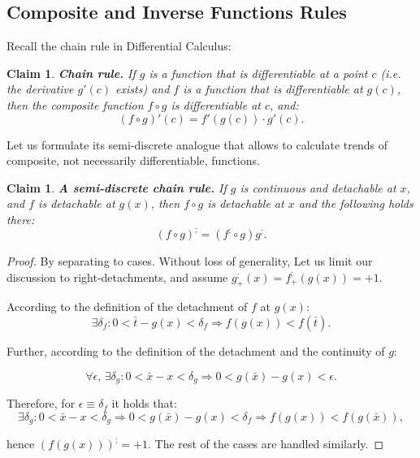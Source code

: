 \documentclass[11pt]{book}
\newtheorem{clm}[thm]{Claim}
\begin{document}
\subsection{Composite and Inverse Functions Rules}

Recall the chain rule in Differential Calculus:
\begin{clm}\textbf{Chain rule. }If $g$ is a function that is differentiable at a point $c$ (i.e. the derivative $g'\left(c\right)$ exists) and $f$ is a function that is differentiable at $g\left(c\right)$, then the composite function $f\circ g$ is differentiable at $c$, and:
$$\left(f\circ g\right)'\left(c\right)=f'\left(g\left(c\right)\right)\cdot g'\left(c\right).$$
\label{chain_rule_derivative}
\end{clm}
Let us formulate its semi-discrete analogue that allows to calculate trends of composite, not necessarily differentiable, functions.
\begin{clm}\textbf{A semi-discrete chain rule.} If $g$ is continuous and detachable at $x$, and $f$ is detachable at $g\left(x\right)$, then $f\circ g $ is detachable at $x$ and the following holds there:
$$\left( f \circ g \right) ^{;}=\left(f^{;}\circ g\right)g^{;}.$$
\label{chain_rule_detachment}
\end{clm}

\begin{proof}By separating to cases. Without loss of generality, Let us limit our discussion to right-detachments, and assume $g_{+}^{;}\left(x\right)=f_{+}^{;}\left(g\left(x\right)\right)=+1.$

According to the definition of the detachment of $f$ at $g\left(x\right)$:
$$\exists\delta_{f}:0<\bar{t}-g\left(x\right)<\delta_{f}\Longrightarrow f\left(g\left(x\right)\right)<f\left(\bar{t}\right).$$

Further, according to the definition of the detachment and the continuity of $g$:

$$\forall\epsilon,\,\exists\delta_{g}:0<\bar{x}-x<\delta_{g}\Longrightarrow0<g\left(\bar{x}\right)-g\left(x\right)<\epsilon.$$

Therefore, for $\epsilon\equiv\delta_{f}$ it holds that:
$$\exists\delta_{g}:0<\bar{x}-x<\delta_{g}\Longrightarrow0<g\left(\bar{x}\right)-g\left(x\right)<\delta_{f}\Longrightarrow f\left(g\left(x\right)\right)<f\left(g\left(\bar{x}\right)\right),$$

hence $\left(f\left(g\left(x\right)\right)\right)^{;}=+1.$ The rest of the cases are handled similarly.
\end{proof}
\end{document}

